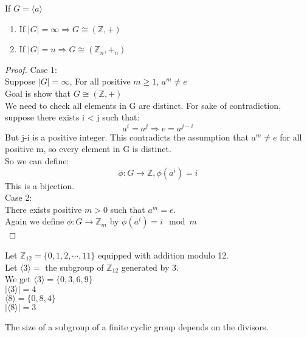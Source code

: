 
\begin{theorem}
    If $G = \langle a \rangle$ 
    \begin{enumerate}
        \item If $|G| = \infty  \Longrightarrow  G \cong (\mathbb{Z}, + )$ 
        \item If $|G| = n \Longrightarrow  G \cong (\mathbb{Z}_n, +_n )$ 
    \end{enumerate}
\end{theorem}
\begin{proof}
    Case 1:\\
    Suppose $|G| = \infty$, For all positive $m \geq 1$, $a^m \neq e$\\
    Goal is show that $G \cong (\mathbb{Z}, + )$\\
    We need to check all elements in G are distinct. For sake of contradiction, suppose there exists i < j such that:  
    \[a^i = a^j \Rightarrow e = a^{j-i}\]
    But j-i is a positive integer. This contradicts the assumption that $a^m \neq e$ for all positive m, so every element in G is distinct.\\
    So we can define:
    \[\phi : G \rightarrow \mathbb{Z}, \phi(a^i) = i\]
    This is a bijection.\\
    Case 2:\\
    There exists positive $m > 0$ such that $a^m = e$.\\
    Again we define $\phi : G \rightarrow \mathbb{Z}_m$ by $\phi(a^i) = i \mod m$\\
\end{proof}

\begin{eg}
    Let $\mathbb{Z}_{12} = \{0, 1, 2, \cdots, 11\}$ equipped with addition modulo 12.\\
    Let $\langle 3 \rangle = $ the subgroup of $\mathbb{Z}_{12}$ generated by 3.\\
    We get $\langle 3 \rangle = \{0, 3, 6, 9\}$\\
    $|\langle 3 \rangle| = 4$\\
    $\langle 8 \rangle = \{0, 8, 4\}$\\
    $|\langle 8 \rangle| = 3$\\
\end{eg}

\begin{remark}
    The size of a subgroup of a finite cyclic group depends on the divisors. 
\end{remark}

